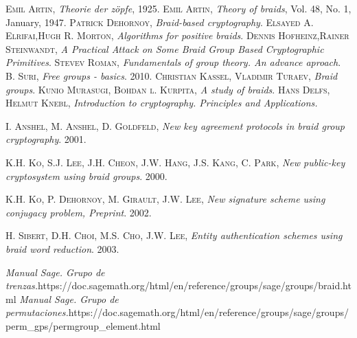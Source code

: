 \documentclass[12pt]{book}
\theoremstyle{definition}
\begin{document}
\begin{thebibliography}{X}
\textsc{Emil Artin}, \textit{Theorie der z\"opfe}, 1925.
\textsc{Emil Artin}, \textit{Theory of braids}, Vol. 48, No. 1, January, 1947.
\textsc{Patrick Dehornoy}, \textit{Braid-based cryptography}.
\textsc{Elsayed A. Elrifai},\textsc{Hugh R. Morton}, \textit{Algorithms for positive braids}.
\textsc{Dennis Hofheinz},\textsc{Rainer Steinwandt}, \textit{A Practical Attack on Some Braid Group Based
Cryptographic Primitives}.
\textsc{Stevev Roman}, \textit{Fundamentals of group theory. An advance aproach}.
\textsc{B. Suri}, \textit{Free groups - basics}. 2010.
\textsc{Christian Kassel}, \textsc{Vladimir Turaev}, \textit{Braid groups}.
\textsc{Kunio Murasugi}, \textsc{Bohdan l. Kurpita}, \textit{A study of braids}.
\textsc{Hans Delfs}, \textsc{Helmut Knebl}, \textit{Introduction to cryptography. Principles and Applications.}

\textsc{I. Anshel}, \textsc{M. Anshel}, \textsc{D. Goldfeld}, \textit{New key agreement protocols in braid group cryptography}. 2001.


\textsc{K.H. Ko}, \textsc{S.J. Lee}, \textsc{J.H. Cheon}, \textsc{J.W. Hang}, \textsc{J.S. Kang}, \textsc{C. Park}, \textit{New public-key cryptosystem using braid groups}. 2000.

\textsc{K.H. Ko}, \textsc{P. Dehornoy}, \textsc{M. Girault}, \textsc{J.W. Lee}, \textit{New signature scheme using conjugacy problem, Preprint}. 2002.

\textsc{H. Sibert}, \textsc{D.H. Choi}, \textsc{M.S. Cho}, \textsc{J.W. Lee}, \textit{Entity authentication schemes using braid word reduction}. 2003.


\textit{Manual Sage. Grupo de trenzas.}\newline https://doc.sagemath.org/html/en/reference/groups/sage/groups/braid.html
 \textit{Manual Sage. Grupo de permutaciones.}\newline https://doc.sagemath.org/html/en/reference/groups/sage/groups/perm\_gps/\newline permgroup\_element.html
\end{thebibliography}













		
\end{document}

